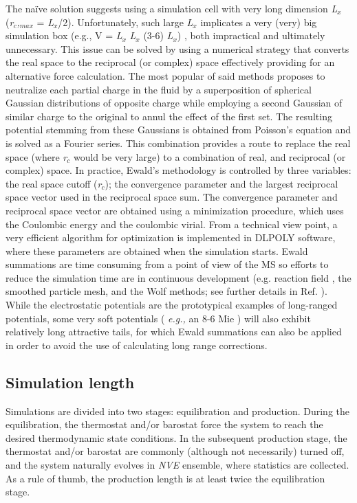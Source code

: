 \documentclass[9pt,bestpractices]{livecoms}
\begin{document}
The na\"{i}ve solution suggests using a simulation cell with very long
dimension \textit{L}$_{x}$ (\textit{r}$_{c}$\textit{,}$_{max}$ = \textit{L}$_{x}$/2).
Unfortunately, such large \textit{L}$_{x}$ implicates a very (very) big
simulation box (e.g., V = \textit{L}$_{x}$ \textit{L}$_{x}$ (3-6)
\textit{L}$_{x}$) , both impractical and ultimately unnecessary. This issue can
be solved by using a numerical strategy that converts the real space to
the reciprocal (or complex) space effectively providing for an alternative force
calculation.  The most popular of said methods \citep{ewald1921}
proposes to neutralize
each partial charge in the fluid by a superposition of spherical Gaussian
distributions of opposite charge while employing a second Gaussian of similar
charge to the original to annul the effect of the first set. The resulting
potential stemming from these Gaussians is obtained from Poisson's equation and
is solved as a Fourier series. This combination provides a route to replace the
real space (where \textit{r}$_{c}$ would be very large) to a combination of
real, and reciprocal (or complex) space. In practice, Ewald's methodology
is controlled by three variables: the real space cutoff (\textit{r}$_{c}$); the
convergence parameter and the largest reciprocal space vector used in the
reciprocal space sum. The convergence parameter and reciprocal space vector are
obtained using a minimization procedure, which uses the Coulombic energy and
the coulombic virial. From a technical view point, a very efficient algorithm
for optimization is implemented in DLPOLY software, where these parameters are
obtained when the simulation starts. Ewald summations are time consuming from
a point of view of the MS so efforts to reduce the simulation time are in
continuous development (e.g. reaction field \citep{barker1973,watts1974},
the smoothed particle mesh\citep{darden1993},
and the Wolf\citep{wolf1999} methods; see further details in Ref. \citep{allen2017}).
While the electrostatic potentials are the
prototypical examples of long-ranged potentials, some very soft potentials
( \textit{e.g.,} an 8-6 Mie ) will also exhibit relatively long attractive
tails, for which Ewald summations can also be applied in order to avoid the use
of calculating long range corrections\citep{kissel}.

\subsection{Simulation length} 
\label{sec:length}
Simulations are divided into two stages: equilibration and production. During
the equilibration, the thermostat and/or barostat force the system to reach the
desired thermodynamic state conditions. In the subsequent production stage, the
thermostat and/or barostat are commonly (although not necessarily) turned off,
and the system naturally evolves in \textit{NVE} ensemble, where statistics are
collected. As a rule of thumb, the production length is at least twice the
equilibration stage. 
\end{document}
